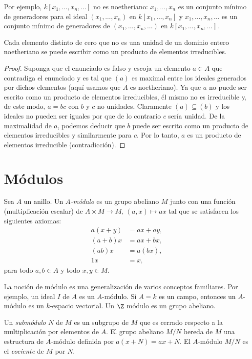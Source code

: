 Por ejemplo, $k[x_1,\ldots,x_n,\ldots]$ no es noetheriano: $x_1, \ldots, x_n$ es un conjunto mínimo de generadores para el ideal $(x_1,\ldots,x_n)$ en $k[x_1,\ldots,x_n]$ y $x_1,\ldots,x_n,\ldots$ es un conjunto mínimo de generadores de $(x_1,\ldots,x_n,\ldots)$ en $k[x_1,\ldots,x_n,\ldots]$.

\begin{proposition}
  Cada elemento distinto de cero que no es una unidad de un dominio entero noetheriano se puede escribir como un producto de elementos irreducibles.
\end{proposition}
\begin{proof}
  Suponga que el enunciado es falso y escoja un elemento $a\in A$ que contradiga el enunciado y es tal que $(a)$ es maximal entre los ideales generados por dichos elementos (aquí usamos que $A$ es noetheriano). Ya que $a$ no puede ser escrito como un producto de elementos irreducibles, él mismo no es irreducible y, de este modo, $a = bc$ con $b$ y $c$ no unidades. Claramente $(a) \subseteq (b) $ y los ideales no pueden ser iguales por que de lo contrario $c$ sería unidad. De la maximalidad de $a$, podemos deducir que $b$ puede ser escrito como un producto de elementos irreducibles y similarmente para $c$. Por lo tanto, $a$ es un producto de elementos irreducible (contradicción).
\end{proof}




\section{Módulos}

Sea $A$ un anillo. Un \emph{$A$-módulo} es un grupo abeliano $M$ junto con una función (multiplicación escalar) de $A\times M \to M$, $(a,x) \mapsto ax$ tal que se satisfacen los siguientes axiomas:
\begin{align*}
  a(x+y) &= ax + ay, \\
  (a+b)x &= ax + bx, \\
  (ab)x &= a(bx), \\
  1x &= x,
\end{align*}
para todo $a,b \in A$ y todo $x,y \in M$.

La noción de módulo es una generalización de varios conceptos familiares. Por ejemplo, un ideal $I$ de $A$ es un $A$-módulo. Si $A = k$ es un campo, entonces un $A$-módulo es un $k$-espacio vectorial. Un $\Z$ módulo es un grupo abeliano.

Un \emph{submódulo} $N$ de $M$ es un subgrupo de $M$ que es cerrado respecto a la multiplicación por elementos de $A$. El grupo abeliano $M/N$ hereda de $M$ una estructura de $A$-módulo definida por $a(x+N) = ax + N$. El $A$-módulo $M/N$ es el \emph{cociente} de $M$ por $N$.

